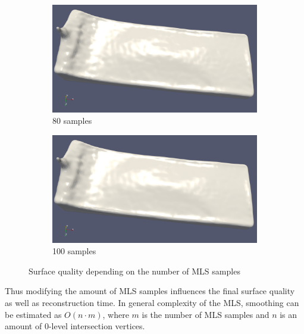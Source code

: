 \begin{figure}[H]
\begin{center}
\begin{subfigure}[b]{0.49\textwidth}
			\includegraphics[width=\textwidth]{figures/MlsSamples80png.png}
			\caption{80 samples}
		\end{subfigure}
		\begin{subfigure}[b]{0.49\textwidth}
			\includegraphics[width=\textwidth]{figures/MlsSamples100.png}
			\caption{100 samples}
		\end{subfigure}
	\end{center}
	\caption{Surface quality depending on the number of MLS samples} \label{fig:mls_samples_example_surfaces}
\end{figure}
Thus modifying the amount of MLS samples influences the final surface quality as well as reconstruction time. In general complexity of the MLS, smoothing can be estimated as $O(n \cdot m)$, where $m$ is the number of MLS samples and $n$ is an amount of 0-level intersection vertices.
